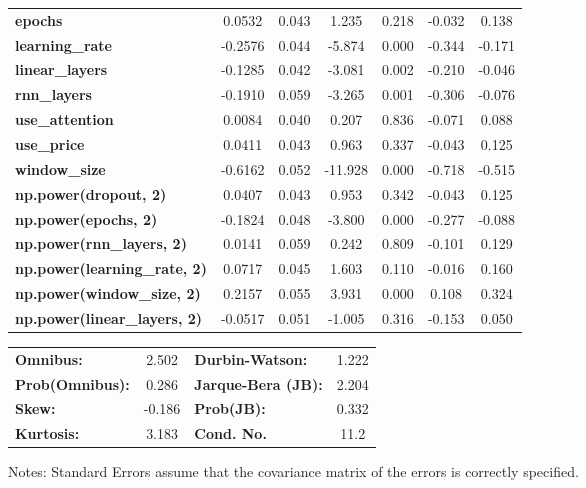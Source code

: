 \begin{center}
\begin{tabular}{lcccccc}
\textbf{epochs}                            &       0.0532  &        0.043     &     1.235  &         0.218        &       -0.032    &        0.138     \\
\textbf{learning\_rate}                    &      -0.2576  &        0.044     &    -5.874  &         0.000        &       -0.344    &       -0.171     \\
\textbf{linear\_layers}                    &      -0.1285  &        0.042     &    -3.081  &         0.002        &       -0.210    &       -0.046     \\
\textbf{rnn\_layers}                       &      -0.1910  &        0.059     &    -3.265  &         0.001        &       -0.306    &       -0.076     \\
\textbf{use\_attention}                    &       0.0084  &        0.040     &     0.207  &         0.836        &       -0.071    &        0.088     \\
\textbf{use\_price}                        &       0.0411  &        0.043     &     0.963  &         0.337        &       -0.043    &        0.125     \\
\textbf{window\_size}                      &      -0.6162  &        0.052     &   -11.928  &         0.000        &       -0.718    &       -0.515     \\
\textbf{np.power(dropout, 2)}              &       0.0407  &        0.043     &     0.953  &         0.342        &       -0.043    &        0.125     \\
\textbf{np.power(epochs, 2)}               &      -0.1824  &        0.048     &    -3.800  &         0.000        &       -0.277    &       -0.088     \\
\textbf{np.power(rnn\_layers, 2)}          &       0.0141  &        0.059     &     0.242  &         0.809        &       -0.101    &        0.129     \\
\textbf{np.power(learning\_rate, 2)}       &       0.0717  &        0.045     &     1.603  &         0.110        &       -0.016    &        0.160     \\
\textbf{np.power(window\_size, 2)}         &       0.2157  &        0.055     &     3.931  &         0.000        &        0.108    &        0.324     \\
\textbf{np.power(linear\_layers, 2)}       &      -0.0517  &        0.051     &    -1.005  &         0.316        &       -0.153    &        0.050     \\
\bottomrule
\end{tabular}
\begin{tabular}{lclc}
\textbf{Omnibus:}       &  2.502 & \textbf{  Durbin-Watson:     } &    1.222  \\
\textbf{Prob(Omnibus):} &  0.286 & \textbf{  Jarque-Bera (JB):  } &    2.204  \\
\textbf{Skew:}          & -0.186 & \textbf{  Prob(JB):          } &    0.332  \\
\textbf{Kurtosis:}      &  3.183 & \textbf{  Cond. No.          } &     11.2  \\
\bottomrule
\end{tabular}
\end{center}

Notes: \newline
 [1] Standard Errors assume that the covariance matrix of the errors is correctly specified.